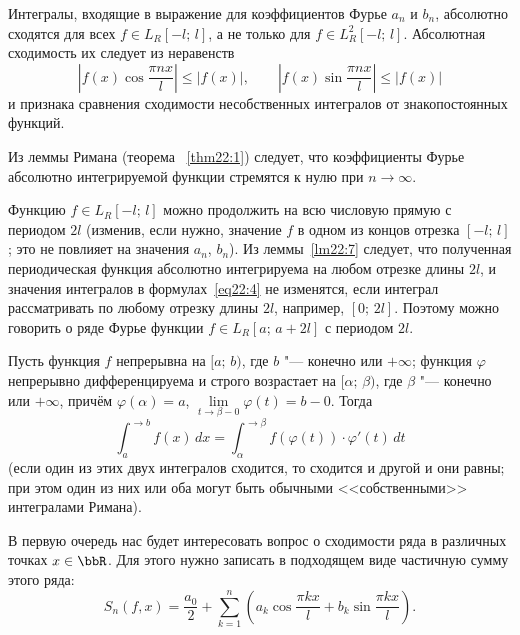 \begin{notion}
Интегралы, входящие в выражение для коэффициентов Фурье $a_n$ и $b_n$, абсолютно сходятся для всех $f \in L_R[-l;\, l]$, а не только для $f \in L_R^2[-l;\, l]$. Абсолютная сходимость их следует из неравенств
$$
\left|f(x)\cos\frac{\pi n x}{l}\right| \le |f(x)|, \qquad \left|f(x)\sin\frac{\pi n x}{l}\right| \le |f(x)|
$$
и признака сравнения сходимости несобственных интегралов от знакопостоянных функций.

Из леммы Римана (теорема ~\ref{thm22:1}) следует, что коэффициенты Фурье абсолютно интегрируемой функции стремятся к нулю при $n \to \infty$.

Функцию $f \in L_R[-l;\, l]$ можно продолжить на всю числовую прямую с периодом $2l$ (изменив, если нужно, значение $f$ в одном из концов отрезка $[-l;\, l]$; это не повлияет на значения $a_n$, $b_n$). Из леммы~\ref{lm22:7} следует, что полученная периодическая функция абсолютно интегрируема на любом отрезке длины $2l$, и значения интегралов в формулах~\eqref{eq22:4} не изменятся, если интеграл рассматривать по любому отрезку длины $2l$, например, $[0;\, 2l]$. Поэтому можно говорить о ряде Фурье функции $f \in L_R[a;\, a + 2l]$ с периодом $2l$.
\end{notion}

\begin{thm} \label{th13:5}
Пусть функция $f$ непрерывна на $[a;\, b)$, где $b$ "--- конечно или $+\infty$; функция $\varphi$ непрерывно дифференцируема и строго возрастает на $[\alpha;\, \beta)$, где $\beta$ "--- конечно или $+\infty$, причём $\varphi(\alpha) = a$, $\lim\limits_{t \to \beta - 0} \varphi(t) = b - 0$. Тогда
\begin{equation} \label{eq13:2}
\int_a^{\to b} f(x)\,dx = \int_{\alpha}^{\to \beta} f(\varphi(t)) \cdot \varphi'(t)\,dt
\end{equation}
(если один из этих двух интегралов сходится, то сходится и другой и они равны; при этом один из них или оба могут быть обычными <<собственными>> интегралами Римана).
\end{thm}

В первую очередь нас будет интересовать вопрос о сходимости ряда в различных точках $x \in \bbR$. Для этого нужно записать в подходящем виде частичную сумму этого ряда:
$$
S_n(f, x) = \frac{a_0}{2} + \sum_{k=1}^{n} \left(a_k \cos\frac{\pi k x}{l} + b_k \sin\frac{\pi k x}{l}\right).
$$

